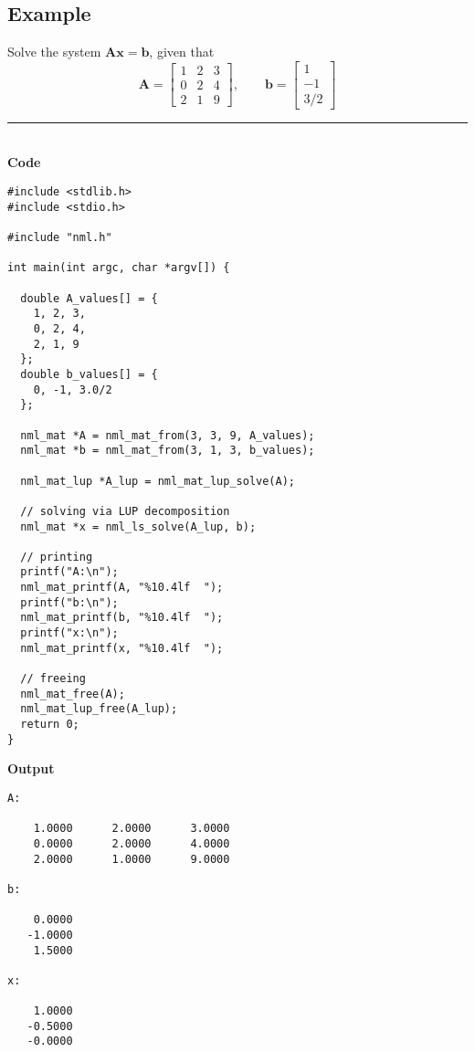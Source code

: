 \subsection{Example}

\textsf{
\example Solve the system $\mathbf{A} \mathbf {x} = \mathbf{b}$, given that
$$
\mathbf{A} = \left[
\begin{array}{rrr}
1 & 2 & 3 \\
0 & 2 & 4 \\
2 & 1 & 9
\end{array}
\right]
,\qquad 
\mathbf{b} = \left[
\begin{array}{r}
1 \\
-1 \\
3/2
\end{array}
\right]
$$
}

\rule{80mm}{0.5pt}\\
{\bf Code}
\begin{verbatim}
#include <stdlib.h>
#include <stdio.h>

#include "nml.h"

int main(int argc, char *argv[]) {

  double A_values[] = {
    1, 2, 3,
    0, 2, 4,
    2, 1, 9
  };
  double b_values[] = {
    0, -1, 3.0/2
  };

  nml_mat *A = nml_mat_from(3, 3, 9, A_values);
  nml_mat *b = nml_mat_from(3, 1, 3, b_values);

  nml_mat_lup *A_lup = nml_mat_lup_solve(A);

  // solving via LUP decomposition
  nml_mat *x = nml_ls_solve(A_lup, b);

  // printing
  printf("A:\n");
  nml_mat_printf(A, "%10.4lf  ");
  printf("b:\n");
  nml_mat_printf(b, "%10.4lf  ");
  printf("x:\n");
  nml_mat_printf(x, "%10.4lf  ");

  // freeing
  nml_mat_free(A); 
  nml_mat_lup_free(A_lup);
  return 0;
}
\end{verbatim}

\hsep
{\bf Output}
\begin{verbatim}
A:

    1.0000      2.0000      3.0000  
    0.0000      2.0000      4.0000  
    2.0000      1.0000      9.0000  

b:

    0.0000  
   -1.0000  
    1.5000  

x:

    1.0000  
   -0.5000  
   -0.0000  
\end{verbatim}


